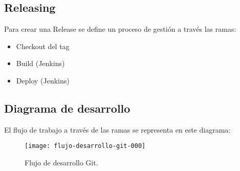 \subsection{Releasing}

\par Para crear una Release se define un proceso de gestión a través las ramas:

\begin{itemize}
    \item Checkout del tag
    \item Build (Jenkins)
    \item Deploy (Jenkins)
\end{itemize}

\subsection{Diagrama de desarrollo}

\par El flujo de trabajo a través de las ramas se representa en este diagrama:

\begin{figure}[H]
\centering
\texttt{[image: flujo-desarrollo-git-000]}
\caption{Flujo de desarrollo Git.}
\label{fig:flujo-desarrollo-git-000}
\end{figure}


